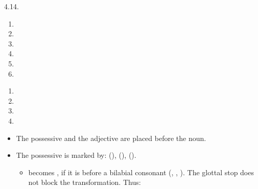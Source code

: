 \begin{refsection}
\begin{practiceproblemsolution}{4.14. \langnameTicuna}
\largerpage
\begin{solutions}[label=Solution 4.14\alph*]
    \item {}
    \item \begin{enumerate}
    \item {}
    \item {}
    \item {}
    \item {}
    \item {}
    \item {}
\end{enumerate}
\item
\begin{multicols}{2}
\begin{enumerate}[start = 7]
    \item {}
    \item {}
    \item {}
    \item {}
\end{enumerate}
\end{multicols}
\end{solutions}


\begin{itemize}
    \item The possessive and the adjective are placed before the noun.
    \item The possessive is marked by:  (),  (),  ().
    \begin{itemize}
        \item {} becomes , if it is before a bilabial consonant (, , ). The glottal stop does not block the transformation. Thus:


\end{itemize}
\end{itemize}
\end{practiceproblemsolution}
\end{refsection}
